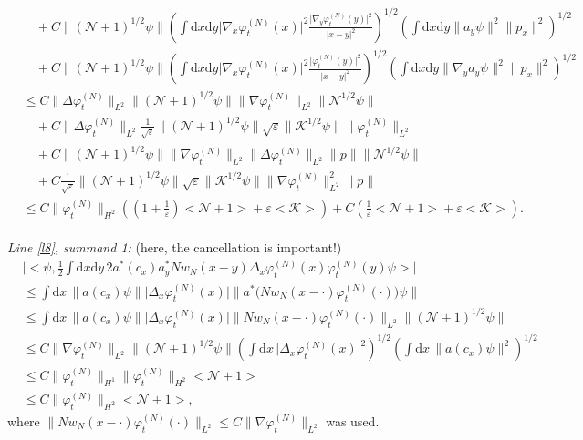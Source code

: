 \documentclass[11pt,a4paper,DIV11]{scrartcl}	%
\newcommand{\di}{\textrm{d}}		%
\newcommand{\Ncal}{\mathcal{N}}		%
\newcommand{\Kcal}{\mathcal{K}}		%
\newcommand{\estlist}[2]{\emph{\vspace{.3em}\\Line \ref{l#1}, summand #2:}}
\newcommand{\scal}[2]{\big<#1,#2\big>} %
\newcommand{\norm}[1]{\lVert#1\rVert}	%
\newcommand{\ev}[1]{\big<#1\big>}	%
\newcommand{\ph}{\varphi_t^{(N)}}	%
\begin{document}
\begin{fleqn}[0.5em]
\begin{align*}
& \quad + C \norm{(\Ncal+1)^{1/2}\psi} \left(\int \di x\di y \lvert \nabla_x\ph(x)\rvert^2 \frac{\lvert\nabla_y \ph(y)\rvert^2}{\lvert x-y \rvert^2} \right)^{1/2} \left(\int \di x\di y \norm{a_y \psi}^2 \norm{p_x}^2 \right)^{1/2} \\
& \quad + C \norm{(\Ncal+1)^{1/2}\psi} \left(\int \di x\di y \lvert \nabla_x\ph(x)\rvert^2 \frac{\lvert \ph(y)\rvert^2}{\lvert x-y\rvert^2} \right)^{1/2} \left(\int \di x\di y \norm{\nabla_y a_y\psi}^2 \norm{p_x}^2 \right)^{1/2} \\
& \leq C \norm{\Delta \ph}_{L^2} \norm{(\Ncal+1)^{1/2}\psi} \norm{\nabla \ph}_{L^2} \norm{\Ncal^{1/2}\psi} \\
& \quad + C\norm{\Delta \ph}_{L^2} \frac{1}{\sqrt{\varepsilon}} \norm{(\Ncal+1)^{1/2}\psi}  \sqrt{\varepsilon}\norm{\Kcal^{1/2}\psi} \norm{\ph}_{L^2} \\
& \quad + C \norm{(\Ncal+1)^{1/2}\psi} \norm{\nabla \ph}_{L^2} \norm{\Delta \ph}_{L^2} \norm{p} \norm{\Ncal^{1/2}\psi} \\
& \quad + C \frac{1}{\sqrt{\varepsilon}}\norm{(\Ncal+1)^{1/2}\psi} \sqrt{\varepsilon}\norm{\Kcal^{1/2}\psi} \norm{\nabla \ph}_{L^2}^2 \norm{p} \\
& \leq C \norm{\ph}_{H^2} \left( (1+\frac{1}{\varepsilon})\ev{\Ncal+1} + \varepsilon\ev{\Kcal} \right) + C \left( \frac{1}{\varepsilon}\ev{\Ncal+1} + \varepsilon \ev{\Kcal} \right).
\end{align*}
\estlist{8}{1} (here, the cancellation is important!)
\begin{align*}
&\lvert \scal{\psi}{\frac{1}{2}\int \di x\di y\, 2a^\ast(c_x) a^\ast_y N w_N(x-y) \Delta_x \ph(x) \ph(y) \psi}\rvert\\
& \leq \int \di x\, \norm{a(c_x)\psi} \lvert \Delta_x \ph(x)\rvert \norm{a^\ast\big(Nw_N(x-\cdot)\ph(\cdot)\big)\psi} \\
& \leq \int \di x\, \norm{a(c_x)\psi} \lvert \Delta_x \ph(x)\rvert \norm{N w_N(x-\cdot)\ph(\cdot)}_{L^2} \norm{(\Ncal+1)^{1/2}\psi} \\
& \leq C \norm{\nabla\ph}_{L^2} \norm{(\Ncal+1)^{1/2} \psi} \left( \int \di x\, \lvert \Delta_x \ph(x)\rvert^2 \right)^{1/2} \left( \int \di x\, \norm{a(c_x)\psi}^2 \right)^{1/2} \\
& \leq C \norm{\ph}_{H^1} \norm{\ph}_{H^2} \ev{\Ncal+1} \\
& \leq C \norm{\ph}_{H^2} \ev{\Ncal+1},
\end{align*}
where $\norm{Nw_N(x-\cdot)\ph(\cdot)}_{L^2} \leq C\norm{\nabla \ph}_{L^2}$ was used.\\

\end{fleqn}
\end{document}
